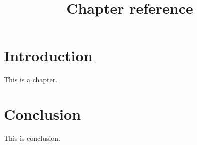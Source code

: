 \documentclass[a4paper,11pt,oneside,openany,report]{jsbook}
\title{Chapter reference}
\begin{document}
\maketitle
\chapter{Introduction}\label{ch:Introduction}
This is a chapter.

\chapter{Conclusion}\label{ch:Conclusion}
This is conclusion.
\end{document}
